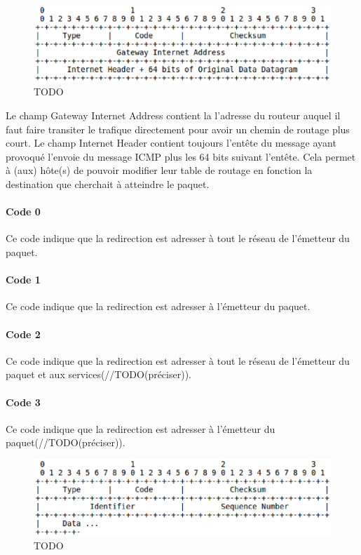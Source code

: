\begin{figure}
\centering
\includegraphics[width=15cm]{./pics/header2.eps}
\caption{TODO}
\label{fig:head2icmp}
\end{figure}
Le champ Gateway Internet Address contient la l'adresse du routeur auquel il
faut faire transiter le trafique directement pour avoir un chemin de routage
plus court.  Le champ Internet Header contient toujours l'entête du message
ayant provoqué l'envoie du message ICMP plus les 64 bits suivant l'entête. Cela
permet à (aux) hôte(s) de pouvoir modifier leur table de routage en fonction la
destination que cherchait à atteindre le paquet.

\paragraph{Code 0}
Ce code indique que la redirection est adresser à tout le réseau de l'émetteur du
paquet.

\paragraph{Code 1}
Ce code indique que la redirection est adresser à l'émetteur du paquet.

\paragraph{Code 2}
Ce code indique que la redirection est adresser à tout le réseau de l'émetteur
du paquet et aux services(//TODO(préciser)).

\paragraph{Code 3} Ce code indique que la redirection est adresser à l'émetteur
du paquet(//TODO(préciser)).

\begin{figure}
\centering
\includegraphics[width=15cm]{./pics/header3.eps}
\caption{TODO}
\label{fig:head3icmp}
\end{figure}

